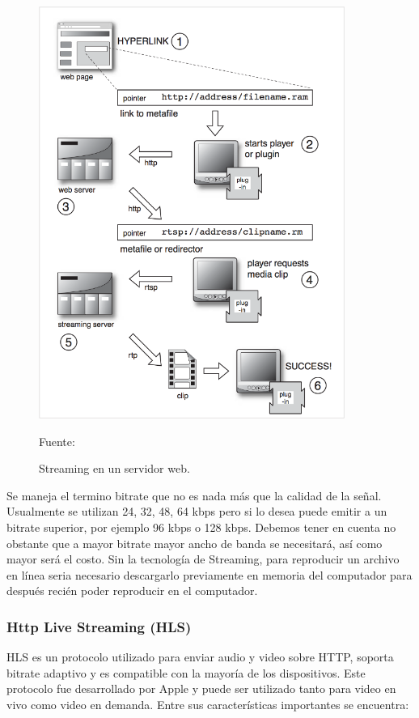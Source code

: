 \begin{figure}[H]
    \begin{center}
        \includegraphics[width=10cm]{img/capitulo_2/streamming.png}
        \caption{Streaming en un servidor web.\\}
        Fuente: \cite{streamming:austerberry}
        \label{fig:streamming}
    \end{center}
\end{figure}

Se maneja el termino bitrate que no es nada más que la calidad de la señal. Usualmente se utilizan 24, 32, 48, 64 kbps pero si lo desea puede emitir a un bitrate superior, por ejemplo 96 kbps o 128 kbps. Debemos tener en cuenta no obstante que a mayor bitrate mayor ancho de banda se necesitará, así como mayor será el costo. Sin la tecnología de Streaming, para reproducir un archivo en línea seria necesario descargarlo previamente en memoria del computador para después recién poder reproducir en el computador.\\

\subsubsection{Http Live Streaming (HLS)}
HLS es un protocolo utilizado para enviar audio y video sobre HTTP, soporta bitrate adaptivo y es compatible con la mayoría de los dispositivos. Este protocolo fue desarrollado por Apple y puede ser utilizado tanto para video en vivo como video en demanda. Entre sus características importantes se encuentra:

